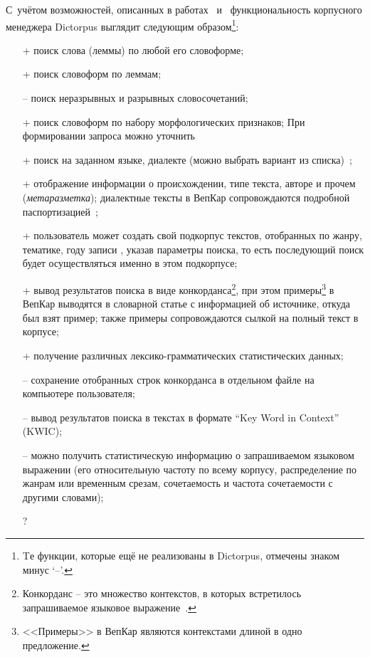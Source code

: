 С~учётом возможностей, описанных в работах~\cite[с.~414--415]{Kibrik2019} и~\cite[с.~10--11]{Zakharov2005} 
функциональность корпусного менеджера Dictorpus выглядит следующим образом\footnote{Tе функции, 
которые ещё не реализованы в Dictorpus, отмечены знаком минус `--'.}:
\begin{itemize}
    \item[+] поиск слова (леммы) по любой его словоформе;
    \item[+] поиск словоформ по леммам;
    \item[--] поиск неразрывных и разрывных словосочетаний;
    \item[+] поиск словоформ по набору морфологических признаков;
При формировании запроса можно уточнить 
    \item[+] поиск на заданном языке, диалекте (можно выбрать вариант из списка)~\cite{KrizhanovskyCorpora2019Dialects};
    \item[+] отображение информации о происхождении, типе текста, авторе и прочем (\emph{метаразметка}); 
        диалектные тексты в ВепКар сопровождаются подробной паспортизацией~\cite{Krizhanovsky2019Architecture};
    \item[+] пользователь может создать свой подкорпус текстов, 
        отобранных по жанру, тематике, году записи , 
        указав параметры поиска, 
        то есть последующий поиск будет осуществляться именно в этом подкорпусе;
    
    \item[+] вывод результатов поиска в виде конкорданса\footnote{
            Конкорданс -- это множество контекстов, 
            в которых встретилось запрашиваемое языковое выражение~\cite[с.~415]{Kibrik2019}.
        }, при этом примеры\footnote{<<Примеры>> 
                                        в ВепКар являются контекстами 
                                        длиной в одно предложение.} 
                в ВепКар выводятся в словарной статье с информацией об источнике, откуда был взят пример; 
                также примеры сопровождаются сылкой на полный текст в корпусе;
    \item[+] получение различных лексико-грамматических статистических данных;
    \item[--] сохранение отобранных строк конкорданса в отдельном файле на компьютере пользователя;
    \item[--] вывод результатов поиска в текстах в формате ``Key Word in Context'' (KWIC);
    \item[--] можно получить статистическую информацию 
        о запрашиваемом языковом выражении (его относительную частоту по всему корпусу,
        распределение по жанрам или временным срезам, сочетаемость и частота сочетаемости с другими словами);
        
    \item[?] 
\end{itemize}

